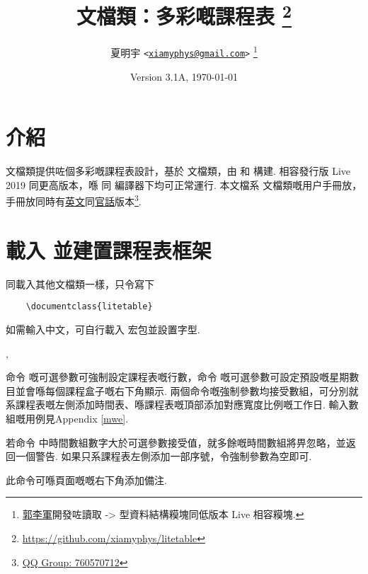 \documentclass[letterpaper]{l3doc}
\title
{
  \bfseries\cls{litetable} 文檔類：多彩嘅課程表
  \footnote{\url{https://github.com/xiamyphys/litetable}}
}
\author
{
  夏明宇 \texttt{<\href{mailto:xiamyphys@gmail.com}{xiamyphys@gmail.com}>}
  \thanks{\href{https://github.com/ljguo1020}{郭李軍}開發咗讀取 \meta{left} -> \meta{right} 型資料結構糢塊同低版本 \hologo{TeX} Live 相容糢塊.}
}
\date{Version 3.1A, \today}
\begin{document}
\maketitle

\section{介紹}

 文檔類提供咗個多彩嘅課程表設計，基於  文檔類，由  和  構建. 相容發行版  Live 2019 同更高版本，喺  同  編譯器下均可正常運行. 本文檔系  文檔類嘅用户手冊放，手冊放同時有\href{./litetable-en.pdf}{英文}同\href{./litetable-cn.pdf}{官話}版本\footnote{\href{https://qm.qq.com/q/RyssAhG4qy}{QQ Group: 760570712}}.

\section{載入  並建置課程表框架}

同載入其他文檔類一樣，只令寫下

\begin{framed}
  \begin{verbatim}
    \documentclass{litetable}
  \end{verbatim}
\end{framed}

如需輸入中文，可自行載入  宏包並設置字型.

\begin{function}{\timelist,\weeklist}
  \begin{syntax}
                 
        
  \end{syntax}

  命令  嘅可選參數可強制設定課程表嘅行數，命令  嘅可選參數可設定預設嘅星期數目並會喺每個課程盒子嘅右下角顯示. 兩個命令嘅強制參數均接受數組，可分別就系課程表嘅左側添加時間表、喺課程表嘅頂部添加對應寬度比例嘅工作日. 輸入數組嘅用例見Appendix \ref{mwe}.
  
  若命令  中時間數組數字大於可選參數接受值，就多餘嘅時間數組將畀忽略，並返回一個警告. 如果只系課程表左側添加一部序號，令強制參數為空即可.
\end{function}

\begin{function}{\more}
  \begin{syntax}
  \end{syntax}

  此命令可喺頁面嘅嘅右下角添加備注.
\end{function}
\end{document}
